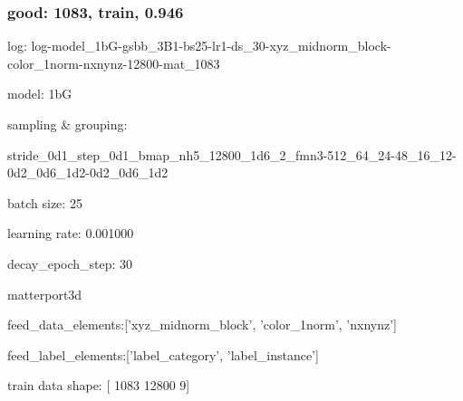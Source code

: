 \documentclass{article}
\begin{document}
\subsubsection{good: 1083, train, 0.946}
log: log-model\_1bG-gsbb\_3B1-bs25-lr1-ds\_30-xyz\_midnorm\_block-color\_1norm-nxnynz-12800-mat\_1083 \par
model: 1bG \par
sampling \& grouping: \par stride\_0d1\_step\_0d1\_bmap\_nh5\_12800\_1d6\_2\_fmn3-512\_64\_24-48\_16\_12-0d2\_0d6\_1d2-0d2\_0d6\_1d2 \par
batch size: 25 \par
learning rate: 0.001000 \par
decay\_epoch\_step: 30 \par
matterport3d  \par
feed\_data\_elements:['xyz\_midnorm\_block', 'color\_1norm', 'nxnynz']  \par
feed\_label\_elements:['label\_category', 'label\_instance']  \par
train data shape: [ 1083 12800     9] \par
\end{document}
